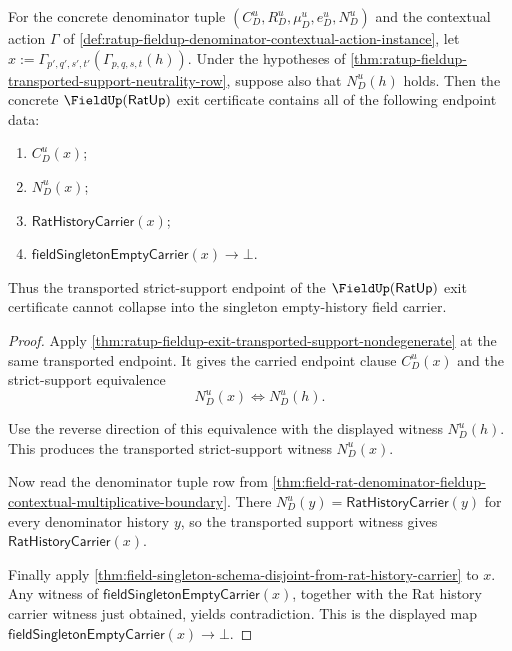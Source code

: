 \begin{theorem}
\label{thm:ratup-fieldup-transported-strict-support-non-singleton}
For the concrete denominator tuple $(C_D^u,R_D^u,\mu_D^u,e_D^u,N_D^u)$ and the
contextual action $\Gamma$ of
\autoref{def:ratup-fieldup-denominator-contextual-action-instance}, let
$x:=\Gamma_{p',q',s',t'}(\Gamma_{p,q,s,t}(h))$. Under the hypotheses of
\autoref{thm:ratup-fieldup-transported-support-neutrality-row}, suppose also
that $N_D^u(h)$ holds. Then the concrete $\FieldUp(\mathsf{RatUp})$ exit
certificate contains all of the following endpoint data:
\begin{enumerate}
  \item $C_D^u(x)$;
  \item $N_D^u(x)$;
  \item $\mathsf{RatHistoryCarrier}(x)$;
  \item $\mathsf{fieldSingletonEmptyCarrier}(x)\to\bot$.
\end{enumerate}
Thus the transported strict-support endpoint of the
$\FieldUp(\mathsf{RatUp})$ exit certificate cannot collapse into the singleton
empty-history field carrier.
\end{theorem}
\begin{proof}
Apply
\autoref{thm:ratup-fieldup-exit-transported-support-nondegenerate} at the same
transported endpoint. It gives the carried endpoint clause $C_D^u(x)$ and the
strict-support equivalence
$$
N_D^u(x)\Longleftrightarrow N_D^u(h).
$$

Use the reverse direction of this equivalence with the displayed witness
$N_D^u(h)$. This produces the transported strict-support witness $N_D^u(x)$.

Now read the denominator tuple row from
\autoref{thm:field-rat-denominator-fieldup-contextual-multiplicative-boundary}.
There $N_D^u(y)=\mathsf{RatHistoryCarrier}(y)$ for every denominator history
$y$, so the transported support witness gives $\mathsf{RatHistoryCarrier}(x)$.

Finally apply
\autoref{thm:field-singleton-schema-disjoint-from-rat-history-carrier} to
$x$. Any witness of $\mathsf{fieldSingletonEmptyCarrier}(x)$, together with the
Rat history carrier witness just obtained, yields contradiction. This is the
displayed map $\mathsf{fieldSingletonEmptyCarrier}(x)\to\bot$.
\end{proof}

